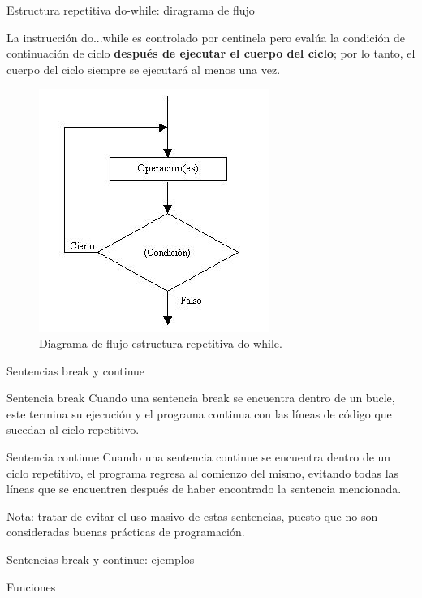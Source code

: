 \documentclass[xcolor=pdftex,table,11pt]{beamer}
\begin{document}
\begin{frame}{Estructura repetitiva do-while: diragrama de flujo}
\begin{block}{}
La instrucción do...while es controlado por centinela pero evalúa la condición de continuación de ciclo \textbf{después de ejecutar el cuerpo del ciclo}; por lo tanto, el cuerpo del ciclo siempre se ejecutará al menos una vez.
\end{block}


\begin{figure}
 \centering
\includegraphics[scale=0.5]{../img/exported/do_while.jpg}
\caption{Diagrama de flujo estructura repetitiva do-while.}
\end{figure}

\end{frame}

\begin{frame}
\codesetstylefrombeamer
{}
\end{frame}

\begin{frame}{Sentencias break y continue}
\begin{block}{Sentencia break}
Cuando una sentencia break se encuentra dentro de un bucle, este termina su ejecución y el programa continua con las líneas de código que sucedan al ciclo repetitivo.
\end{block}

\begin{block}{Sentencia continue}
Cuando una sentencia continue se encuentra dentro de un ciclo repetitivo, el programa regresa al comienzo del mismo, evitando todas las líneas que se encuentren después de haber encontrado la sentencia mencionada. 
\end{block}

Nota: tratar de evitar el uso masivo de estas sentencias, puesto que no son consideradas buenas prácticas de programación.
\end{frame}


\begin{frame}{Sentencias break y continue: ejemplos}
\end{frame}

\begin{frame}{Funciones}
\end{frame}
\end{document}
